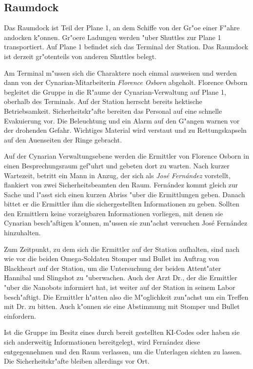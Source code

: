 \subsection{Raumdock}
Das Raumdock ist Teil der Plane 1, an dem Schiffe von der Gr"o\3e einer F"ahre andocken k"onnen. Gr"o\3ere Ladungen werden "uber Shuttles zur Plane 1 transportiert. Auf Plane 1 befindet sich das Terminal der Station. Das Raumdock ist derzeit gr"o\3tenteils von anderen Shuttles belegt.

Am Terminal m"ussen sich die Charaktere noch einmal ausweisen und werden dann von der Cynarian-Mitarbeiterin \emph{Florence Osborn} abgeholt. Florence Osborn begleitet die Gruppe in die R"aume der Cynarian-Verwaltung auf Plane 1, oberhalb des Terminals. Auf der Station herrscht bereits hektische Betriebsamkeit. Sicherheitskr"afte bereiten das Personal auf eine schnelle Evakuierung vor. Die Beleuchtung und ein Alarm auf den G"angen warnen vor der drohenden Gefahr. Wichtiges Material wird verstaut und zu Rettungskapseln auf den Au\3enseiten der Ringe gebracht.

Auf der Cynarian Verwaltungsebene werden die Ermittler von Florence Osborn in einen Besprechungsraum gef"uhrt und gebeten dort zu warten. Nach kurzer Wartezeit, betritt ein Mann in Anzug, der sich als \emph{Jos\'e Fern\'andez} vorstellt, flankiert von zwei Sicherheitsbeamten den Raum. Fern\'andez kommt gleich zur Sache und l"asst sich einen kurzen Abriss "uber die Ermittlungen geben. Danach bittet er die Ermittler ihm die sichergestellten Informationen zu geben. Sollten den Ermittlern keine vorzeigbaren Informationen vorliegen, mit denen sie Cynarian besch"aftigen k"onnen, m"ussen sie zun"achst versuchen Jos\'e Fern\'andez hinzuhalten. 

Zum Zeitpunkt, zu dem sich die Ermittler auf der Station aufhalten, sind nach wie vor die beiden Omega-Soldaten Stomper und Bullet im Auftrag von Blackheart auf der Station, um die Untersuchung der beiden Attent"ater Hannibal und Slingshot zu "uberwachen. Auch der Arzt 
Dr.{}, der die Ermittler "uber die Nanobots informiert hat, ist weiter auf der Station in seinem Labor besch"aftigt. Die Ermittler h"atten also die M"oglichkeit zun"achst um ein Treffen mit Dr.{} zu bitten. Auch k"onnen sie eine Abstimmung mit Stomper und Bullet einfordern.

Ist die Gruppe im Besitz eines durch \ml{} bereit gestellten KI-Codes oder haben sie sich anderweitig Informationen bereitgelegt, wird Fern\'andez diese entgegennehmen und den Raum verlassen, um die Unterlagen sichten zu lassen. Die Sicherheitskr"afte bleiben allerdings vor Ort.

